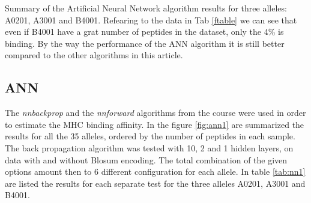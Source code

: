 \begin{table*}[hb]
\caption{Summary of the Artificial Neural Network algorithm results for three alleles: A0201, A3001 and B4001. Refearing to the data in Tab \ref{ftable} we can see that even if B4001 have a grat number of peptides in the dataset, only the 4\% is binding. By the way the performance of the ANN algorithm it is still better compared to the other algorithms in this article.}\label{tab:nn1}

\end{table*}

\subsection*{ANN}



The \textit{nnbackprop} and the \textit{nnforward} algorithms from the course were used in order to estimate the MHC binding affinity.
In the figure \ref{fig:ann1} are summarized the results for all the 35 alleles, ordered by the number of peptides in each sample.
The back propagation algorithm was tested with 10, 2 and 1 hidden layers, on data with and without Blosum encoding. The total combination of the given options amount then to 6 different configuration for each allele.
In table \ref{tab:nn1} are listed the results for each separate test for the three alleles A0201, A3001 and B4001.





